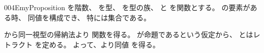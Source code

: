 \documentclass[index]{subfiles}
\begin{document}
\begin{myBlock}{004E}{myProposition}
  を階数、
  を型、
  を型の族、
  と
  を関数とする。
  の要素がある時、
  同値を構成でき、
  特には集合である。
\end{myBlock}
\begin{myProof}
  から同一視型の帰納法より
  関数を得る。
  が命題であるという仮定から、
  とはレトラクト
  を定める。
  よって、より同値
  を得る。
\end{myProof}
\end{document}
